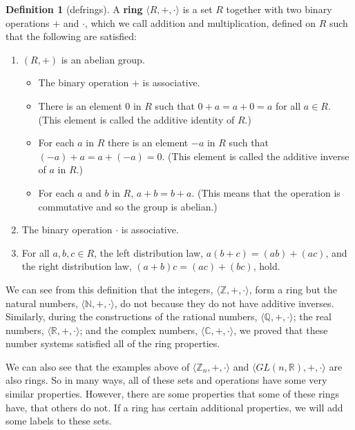 \documentclass[
]{book}
\providecommand{\tightlist}{%
  \setlength{\itemsep}{0pt}\setlength{\parskip}{0pt}}
\theoremstyle{definition}
\newtheorem{definition}{Definition}[chapter]
\theoremstyle{definition}
\theoremstyle{definition}
\theoremstyle{definition}
\theoremstyle{remark}
\begin{document}
\begin{definition}[defrings]

A \textbf{ring} \(\langle R,+,\cdot \rangle\) is a set \(R\) together with two binary operations \(+\) and \(\cdot\), which we call addition and multiplication, defined on \(R\) such that the following are satisfied:

\begin{enumerate}
\def\labelenumi{\arabic{enumi}.}
\tightlist
\item
  \(\left( R,+\right)\) is an abelian group.

  \begin{itemize}
  \tightlist
  \item
    The binary operation \(+\) is associative.
  \item
    There is an element \(0\) in \(R\) such that \(0+a=a+0=a\) for all \(a\in R\). (This element is called the additive identity of \(R\).)
  \item
    For each \(a\) in \(R\) there is an element \(-a\) in \(R\) such that \((-a)+a=a+(-a)=0\). (This element is called the additive inverse of \(a\) in \(R\).)
  \item
    For each \(a\) and \(b\) in \(R\), \(a+b=b+a\). (This means that the operation is commutative and so the group is abelian.)
  \end{itemize}
\item
  The binary operation \(\cdot\) is associative.
\item
  For all \(a,b,c\in R\), the left distribution law, \(a(b+c)=(ab)+(ac)\), and the right distribution law, \((a+b)c=(ac)+(bc)\), hold.
\end{enumerate}

\end{definition}

We can see from this definition that the integers, \(\langle\mathbb{Z},+,\cdot\rangle\), form a ring but the natural numbers, \(\langle\mathbb{N},+,\cdot\rangle\), do not because they do not have additive inverses. Similarly, during the constructions of the rational numbers, \(\langle\mathbb{Q},+,\cdot\rangle\); the real numbers, \(\langle\mathbb{R},+,\cdot\rangle\); and the complex numbers, \(\langle\mathbb{C},+,\cdot\rangle\), we proved that these number systems satisfied all of the ring properties.

We can also see that the examples above of \(\langle\mathbb{Z}_n,+,\cdot\rangle\) and \(\langle GL(n,\mathbb{R}),+,\cdot\rangle\) are also rings. So in many ways, all of these sets and operations have some very similar properties. However, there are some properties that some of these rings have, that others do not. If a ring has certain additional properties, we will add some labels to these sets.
\end{document}

